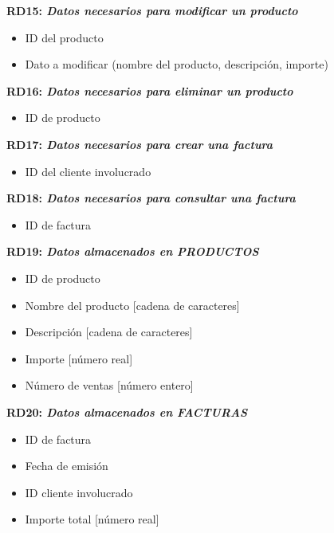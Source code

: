 \documentclass[paper=a4, fontsize=11pt, spanish]{scrartcl}
\begin{document}
	\setlength{\parindent}{0em}
	\textbf{RD15: \textit{Datos necesarios para modificar un producto}}
	\setlength{\parindent}{2em}
	\begin{itemize}
		\item ID del producto
		\item Dato a modificar (nombre del producto, descripción, importe)
	\end{itemize}

	\setlength{\parindent}{0em}
	\textbf{RD16: \textit{Datos necesarios para eliminar un producto}}
	\setlength{\parindent}{2em}
	\begin{itemize}
		\item ID de producto
	\end{itemize}

	\setlength{\parindent}{0em}
	\textbf{RD17: \textit{Datos necesarios para crear una factura}}
	\setlength{\parindent}{2em}
	\begin{itemize}
		\item ID del cliente involucrado
	\end{itemize}

	\setlength{\parindent}{0em}
	\textbf{RD18: \textit{Datos necesarios para consultar una factura}}
	\setlength{\parindent}{2em}
	\begin{itemize}
		\item ID de factura
	\end{itemize}


	\setlength{\parindent}{0em}
	\textbf{RD19: \textit{Datos almacenados en PRODUCTOS}}
	\setlength{\parindent}{2em}
	\begin{itemize}
		\item ID de producto
		\item Nombre del producto [cadena de caracteres]
		\item Descripción [cadena de caracteres]
		\item Importe [número real]
		\item Número de ventas [número entero]
	\end{itemize}

	\setlength{\parindent}{0em}
	\textbf{RD20: \textit{Datos almacenados en FACTURAS}}
	\setlength{\parindent}{2em}
	\begin{itemize}
		\item ID de factura
		\item Fecha de emisión
		\item ID cliente involucrado
		\item Importe total [número real]
	\end{itemize}
\end{document}
